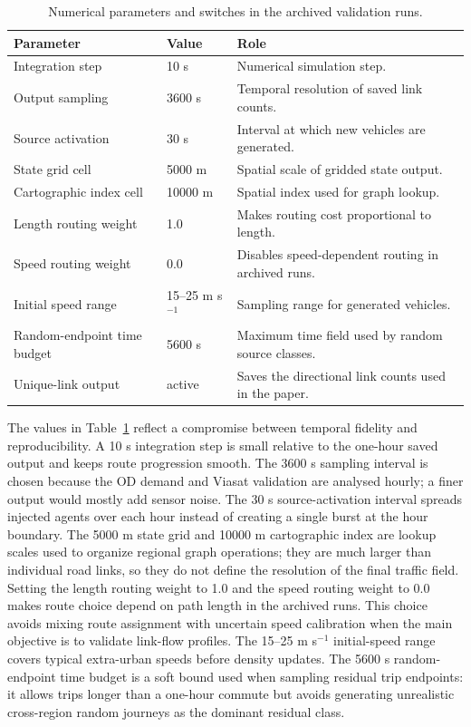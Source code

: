 \documentclass[11pt,a4paper]{article}
\begin{document}
\begin{table}[htbp]
\centering
\caption{Numerical parameters and switches in the archived validation runs.}
\label{tab:parameters}
\begin{tabularx}{\linewidth}{@{}l l X@{}}
\toprule
Parameter & Value & Role \\
\midrule
Integration step & 10 s & Numerical simulation step. \\
Output sampling & 3600 s & Temporal resolution of saved link counts. \\
Source activation & 30 s & Interval at which new vehicles are generated. \\
State grid cell & 5000 m & Spatial scale of gridded state output. \\
Cartographic index cell & 10000 m & Spatial index used for graph lookup. \\
Length routing weight & 1.0 & Makes routing cost proportional to length. \\
Speed routing weight & 0.0 & Disables speed-dependent routing in archived runs. \\
Initial speed range & 15--25 m s$^{-1}$ & Sampling range for generated vehicles. \\
Random-endpoint time budget & 5600 s & Maximum time field used by random
source classes. \\
Unique-link output & active & Saves the directional link counts used in the
paper. \\
\bottomrule
\end{tabularx}
\end{table}

The values in Table~\ref{tab:parameters} reflect a compromise between temporal fidelity and reproducibility. A 10 s integration step is small relative to the one-hour saved output and keeps route progression smooth. The 3600 s sampling interval is chosen because the OD demand and Viasat validation are analysed hourly; a finer output would mostly add sensor noise. The 30 s source-activation interval spreads injected agents over each hour instead of creating a single burst at the hour boundary. The 5000 m state grid and 10000 m cartographic index are lookup scales used to organize regional graph operations; they are much larger than individual road links, so they do not define the resolution of the final traffic field. Setting the length routing weight to 1.0 and the speed routing weight to 0.0 makes route choice depend on path length in the archived runs. This choice avoids mixing route assignment with uncertain speed calibration when the main objective is to validate link-flow profiles. The 15--25 m s$^{-1}$ initial-speed range covers typical extra-urban speeds before density updates. The 5600 s random-endpoint time budget is a soft bound used when sampling residual trip endpoints: it allows trips longer than a one-hour commute but avoids generating unrealistic cross-region random journeys as the dominant residual class.
\end{document}
